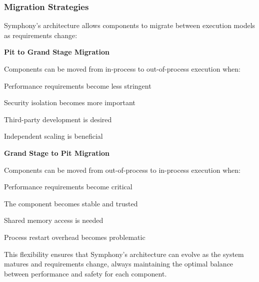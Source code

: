 \subsubsection{Migration Strategies}

Symphony's architecture allows components to migrate between execution models as requirements change:

\textbf{Pit to Grand Stage Migration}

Components can be moved from in-process to out-of-process execution when:
\begin{compactlist}
    \item Performance requirements become less stringent
    \item Security isolation becomes more important
    \item Third-party development is desired
    \item Independent scaling is beneficial
\end{compactlist}

\textbf{Grand Stage to Pit Migration}

Components can be moved from out-of-process to in-process execution when:
\begin{compactlist}
    \item Performance requirements become critical
    \item The component becomes stable and trusted
    \item Shared memory access is needed
    \item Process restart overhead becomes problematic
\end{compactlist}

This flexibility ensures that Symphony's architecture can evolve as the system matures and requirements change, always maintaining the optimal balance between performance and safety for each component.